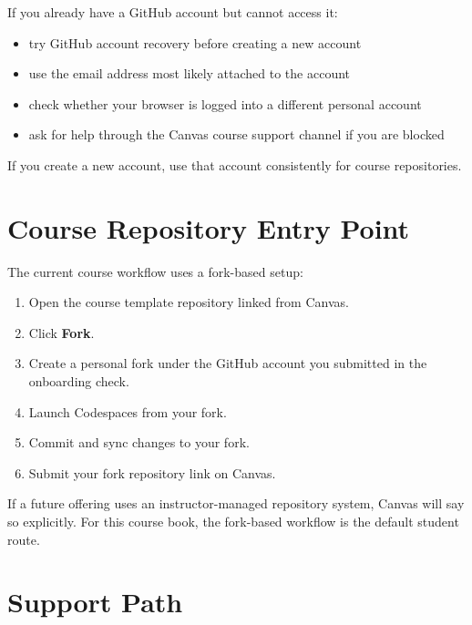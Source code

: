 \documentclass[
  letterpaper,
  DIV=11,
  numbers=noendperiod,
  oneside]{scrreprt}
\providecommand{\tightlist}{%
  \setlength{\itemsep}{0pt}\setlength{\parskip}{0pt}}
\begin{document}

If you already have a GitHub account but cannot access it:

\begin{itemize}
\tightlist
\item
  try GitHub account recovery before creating a new account
\item
  use the email address most likely attached to the account
\item
  check whether your browser is logged into a different personal account
\item
  ask for help through the Canvas course support channel if you are
  blocked
\end{itemize}

If you create a new account, use that account consistently for course
repositories.

\section*{Course Repository Entry
Point}\label{course-repository-entry-point}


The current course workflow uses a fork-based setup:

\begin{enumerate}
\def\labelenumi{\arabic{enumi}.}
\tightlist
\item
  Open the course template repository linked from Canvas.
\item
  Click \textbf{Fork}.
\item
  Create a personal fork under the GitHub account you submitted in the
  onboarding check.
\item
  Launch Codespaces from your fork.
\item
  Commit and sync changes to your fork.
\item
  Submit your fork repository link on Canvas.
\end{enumerate}

If a future offering uses an instructor-managed repository system,
Canvas will say so explicitly. For this course book, the fork-based
workflow is the default student route.

\section*{Support Path}\label{support-path}
\end{document}
